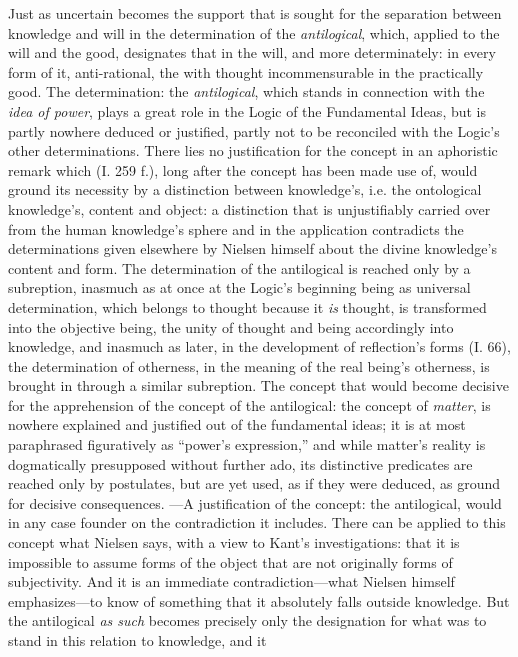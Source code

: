 \documentclass[12pt,a4paper]{book}
\begin{document}
Just as uncertain becomes the support that is sought for the separation between knowledge and will
in the determination of the \emph{antilogical}, which, applied to the will and the good, designates
that in the will, and more determinately: in every form of it, anti-rational, the with thought
incommensurable in the practically good. The determination: the \emph{antilogical}, which stands in
connection with the \emph{idea of power}, plays a great role in the Logic of the Fundamental Ideas,
but is partly nowhere deduced or justified, partly not to be reconciled with the Logic's other
determinations. There lies no justification for the concept in an aphoristic remark which (I. 259 f.),
long after the concept has been made use of, would ground its necessity by a distinction between
knowledge's, i.e. the ontological knowledge's, content and object: a distinction that is unjustifiably
carried over from the human knowledge's sphere and in the application contradicts the determinations
given elsewhere by Nielsen himself about the divine knowledge's content and form. The determination of
the antilogical is reached only by a subreption, inasmuch as at once at the Logic's beginning being as
universal determination, which belongs to thought because it \emph{is} thought, is transformed into the
objective being, the unity of thought and being accordingly into knowledge, and inasmuch as later, in
the development of reflection's forms (I. 66), the determination of otherness, in the meaning of the
real being's otherness, is brought in through a similar subreption. The concept that would become
decisive for the apprehension of the concept of the antilogical: the concept of \emph{matter}, is
nowhere explained and justified out of the fundamental ideas; it is at most paraphrased figuratively as
``power's expression,'' and while matter's reality is dogmatically presupposed without further ado, its
distinctive predicates are reached only by postulates, but are yet used, as if they were deduced, as
ground for decisive consequences. ---A justification of the concept: the antilogical, would in any case
founder on the contradiction it includes. There can be applied to this concept what Nielsen says, with
a view to Kant's investigations: that it is impossible to assume forms of the object that are not
originally forms of subjectivity. And it is an immediate contradiction---what Nielsen himself
emphasizes---to know of something that it absolutely falls outside knowledge. But the antilogical \emph{as
such} becomes precisely only the designation for what was to stand in this relation to knowledge, and it
\end{document}
